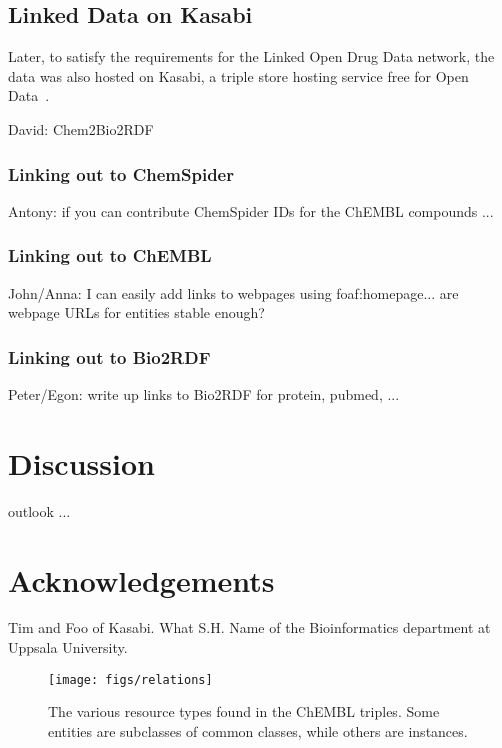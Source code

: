 \documentclass[sw]{iosart2c}
\begin{document}
\subsection{Linked Data on Kasabi}

Later, to satisfy the requirements for the Linked Open Drug Data \cite{Samwald2011}
network, the data was also hosted on Kasabi, a triple store hosting service
free for Open Data~\cite{kasabi}.

David: Chem2Bio2RDF



\subsubsection{Linking out to ChemSpider}

Antony: if you can contribute ChemSpider IDs for the ChEMBL compounds ...

\subsubsection{Linking out to ChEMBL}

John/Anna: I can easily add links to webpages using foaf:homepage... are webpage URLs for entities stable enough?

\subsubsection{Linking out to Bio2RDF}

Peter/Egon: write up links to Bio2RDF for protein, pubmed, ...

\section{Discussion}

outlook ...

\section{Acknowledgements}

Tim and Foo of Kasabi. What S.H. Name of the Bioinformatics department at Uppsala University.

\begin{figure}[t]
\texttt{[image: figs/relations]}
\caption{The various resource types found in the ChEMBL triples. Some entities are subclasses
of common classes, while others are instances.}\label{f1}
\end{figure}
\end{document}
